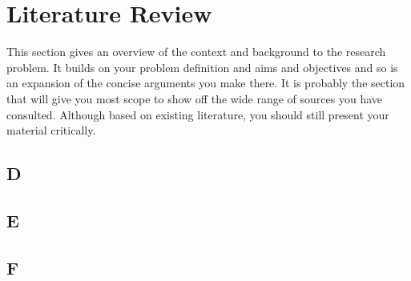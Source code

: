 \chapter{Literature Review}\label{ch:literaturereview}

This section gives an overview of the context and background to the research problem.
It builds on your problem definition and aims and objectives and so is an expansion of the concise arguments you make there.
It is probably the section that will give you most scope to show off the wide range of sources you have consulted.
Although based on existing literature, you should still present your material critically.



\section{D}\label{sec:D}
\lipsum[1-5]

\section{E}\label{sec:E}
\lipsum[1-5]

\section{F}\label{sec:F}
\lipsum[1-5]